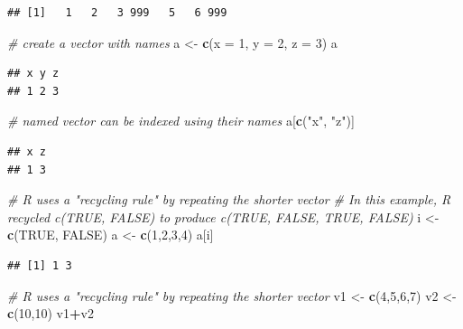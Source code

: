 \documentclass[]{book}
\newenvironment{Shaded}{\begin{snugshade}}{\end{snugshade}}
\newcommand{\CommentTok}[1]{\textcolor[rgb]{0.56,0.35,0.01}{\textit{#1}}}
\newcommand{\DataTypeTok}[1]{\textcolor[rgb]{0.13,0.29,0.53}{#1}}
\newcommand{\DecValTok}[1]{\textcolor[rgb]{0.00,0.00,0.81}{#1}}
\newcommand{\KeywordTok}[1]{\textcolor[rgb]{0.13,0.29,0.53}{\textbf{#1}}}
\newcommand{\NormalTok}[1]{#1}
\newcommand{\OperatorTok}[1]{\textcolor[rgb]{0.81,0.36,0.00}{\textbf{#1}}}
\newcommand{\OtherTok}[1]{\textcolor[rgb]{0.56,0.35,0.01}{#1}}
\newcommand{\StringTok}[1]{\textcolor[rgb]{0.31,0.60,0.02}{#1}}
\begin{document}
\begin{verbatim}
## [1]   1   2   3 999   5   6 999
\end{verbatim}

\begin{Shaded}
\begin{Highlighting}[]
\CommentTok{# create a vector with names}
\NormalTok{a <-}\StringTok{ }\KeywordTok{c}\NormalTok{(}\DataTypeTok{x =} \DecValTok{1}\NormalTok{, }\DataTypeTok{y =} \DecValTok{2}\NormalTok{, }\DataTypeTok{z =} \DecValTok{3}\NormalTok{)}
\NormalTok{a}
\end{Highlighting}
\end{Shaded}

\begin{verbatim}
## x y z 
## 1 2 3
\end{verbatim}

\begin{Shaded}
\begin{Highlighting}[]
\CommentTok{# named vector can be indexed using their names}
\NormalTok{a[}\KeywordTok{c}\NormalTok{(}\StringTok{"x"}\NormalTok{, }\StringTok{"z"}\NormalTok{)]}
\end{Highlighting}
\end{Shaded}

\begin{verbatim}
## x z 
## 1 3
\end{verbatim}

\begin{Shaded}
\begin{Highlighting}[]
\CommentTok{# R uses a "recycling rule" by repeating the shorter vector}
\CommentTok{# In this example, R recycled c(TRUE, FALSE) to produce c(TRUE, FALSE, TRUE, FALSE)}
\NormalTok{i <-}\StringTok{ }\KeywordTok{c}\NormalTok{(}\OtherTok{TRUE}\NormalTok{, }\OtherTok{FALSE}\NormalTok{)}
\NormalTok{a <-}\StringTok{ }\KeywordTok{c}\NormalTok{(}\DecValTok{1}\NormalTok{,}\DecValTok{2}\NormalTok{,}\DecValTok{3}\NormalTok{,}\DecValTok{4}\NormalTok{)}
\NormalTok{a[i]}
\end{Highlighting}
\end{Shaded}

\begin{verbatim}
## [1] 1 3
\end{verbatim}

\begin{Shaded}
\begin{Highlighting}[]
\CommentTok{# R uses a "recycling rule" by repeating the shorter vector}
\NormalTok{v1 <-}\StringTok{ }\KeywordTok{c}\NormalTok{(}\DecValTok{4}\NormalTok{,}\DecValTok{5}\NormalTok{,}\DecValTok{6}\NormalTok{,}\DecValTok{7}\NormalTok{)}
\NormalTok{v2 <-}\StringTok{ }\KeywordTok{c}\NormalTok{(}\DecValTok{10}\NormalTok{,}\DecValTok{10}\NormalTok{)}
\NormalTok{v1}\OperatorTok{+}\NormalTok{v2}
\end{Highlighting}
\end{Shaded}
\end{document}
